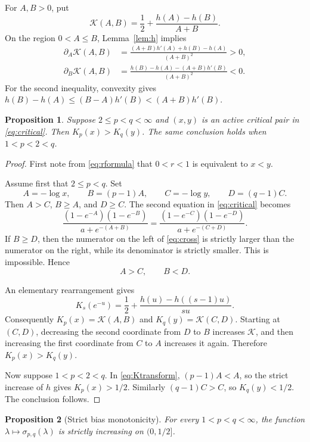\documentclass[11pt]{article}
\newtheorem{proposition}{Proposition}
\newcommand{\Kaux}{\mathcal K}
\begin{document}
For $A,B>0$, put
\[
                   \Kaux(A,B)=\frac12+\frac{h(A)-h(B)}{A+B}.
\]
On the region $0<A\leq B$, Lemma~\ref{lem:h} implies
\begin{align*}
 \partial_A\Kaux(A,B)
 &=\frac{(A+B)h'(A)+h(B)-h(A)}{(A+B)^2}>0,\\
 \partial_B\Kaux(A,B)
 &=\frac{h(B)-h(A)-(A+B)h'(B)}{(A+B)^2}<0.
\end{align*}
For the second inequality, convexity gives
$h(B)-h(A)\leq(B-A)h'(B)<(A+B)h'(B)$.

\begin{proposition}\label{prop:sign}
Suppose $2\leq p<q<\infty$ and $(x,y)$ is an active critical pair in
\eqref{eq:critical}.  Then $K_p(x)>K_q(y)$.  The same conclusion holds when
$1<p<2<q$.
\end{proposition}

\begin{proof}
First note from \eqref{eq:rformula} that $0<r<1$ is equivalent to $x<y$.

Assume first that $2\leq p<q$.  Set
\[
 A=-\log x,\qquad B=(p-1)A,
 \qquad C=-\log y,\qquad D=(q-1)C.
\]
Then $A>C$, $B\geq A$, and $D\geq C$.  The second equation in
\eqref{eq:critical} becomes
\begin{equation}\label{eq:cross}
 \frac{(1-e^{-A})(1-e^{-B})}{a+e^{-(A+B)}}
 =
 \frac{(1-e^{-C})(1-e^{-D})}{a+e^{-(C+D)}}.
\end{equation}
If $B\geq D$, then the numerator on the left of \eqref{eq:cross} is
strictly larger than the numerator on the right, while its denominator is
strictly smaller.  This is impossible.  Hence
\[
                              A>C,\qquad B<D.
\]

An elementary rearrangement gives
\begin{equation}\label{eq:Ktransform}
 K_s(e^{-u})
 =\frac12+\frac{h(u)-h((s-1)u)}{su}.
\end{equation}
Consequently $K_p(x)=\Kaux(A,B)$ and $K_q(y)=\Kaux(C,D)$.
Starting at $(C,D)$, decreasing the second coordinate from $D$ to $B$
increases $\Kaux$, and then increasing the first coordinate from $C$ to
$A$ increases it again.  Therefore $K_p(x)>K_q(y)$.

Now suppose $1<p<2<q$.  In \eqref{eq:Ktransform}, $(p-1)A<A$, so the
strict increase of $h$ gives $K_p(x)>1/2$.  Similarly
$(q-1)C>C$, so $K_q(y)<1/2$.  The conclusion follows.
\end{proof}

\begin{proposition}[Strict bias monotonicity]\label{prop:monotone}
For every $1<p<q<\infty$, the function
$\lambda\mapsto\sigma_{p,q}(\lambda)$ is strictly increasing on
$(0,1/2]$.
\end{proposition}
\end{document}
